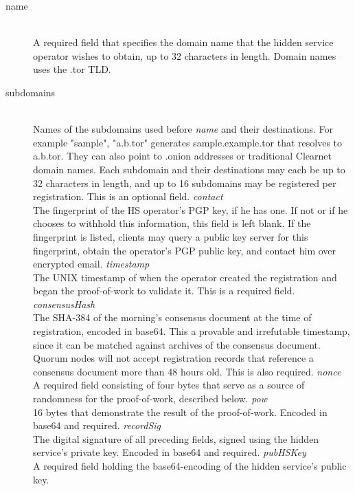 \begin{description}
	\item[name] \hfill \\
		A required field that specifies the domain name that the hidden service operator wishes to obtain, up to 32 characters in length. Domain names uses the .tor TLD.
	\item[subdomains] \hfill \\
		Names of the subdomains used before \emph{name} and their destinations. For example {"sample", "a.b.tor"} generates sample.example.tor that resolves to a.b.tor. They can also point to .onion addresses or traditional Clearnet domain names. Each subdomain and their destinations may each be up to 32 characters in length, and up to 16 subdomains may be registered per registration. This is an optional field.
	\emph{contact} \hfill \\
		The fingerprint of the HS operator's PGP key, if he has one. If not or if he chooses to withhold this information, this field is left blank. If the fingerprint is listed, clients may query a public key server for this fingerprint, obtain the operator's PGP public key, and contact him over encrypted email.
	\emph{timestamp} \hfill \\
		The UNIX timestamp of when the operator created the registration and began the proof-of-work to validate it. This is a required field.
	\emph{consensusHash} \hfill \\
		The SHA-384 of the morning's consensus document at the time of registration, encoded in base64. This a provable and irrefutable timestamp, since it can be matched against archives of the consensus document. Quorum nodes will not accept registration records that reference a consensus document more than 48 hours old. This is also required.
	\emph{nonce} \hfill \\
		A required field consisting of four bytes that serve as a source of randomness for the proof-of-work, described below.
	\emph{pow} \hfill \\
		16 bytes that demonstrate the result of the proof-of-work. Encoded in base64 and required.
	\emph{recordSig} \hfill \\
		The digital signature of all preceding fields, signed using the hidden service's private key. Encoded in base64 and required.
	\emph{pubHSKey} \hfill \\
		A required field holding the base64-encoding of the hidden service's public key.
\end{description}

